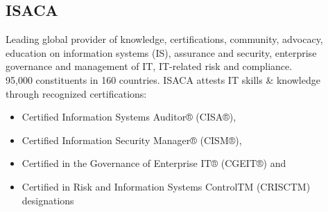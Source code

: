 \documentclass[a4]{article}
\begin{document}
\begin{multicols}{3}
\subsection{ISACA}
Leading global provider of knowledge, certifications, community, advocacy, education on information systems (IS), 
assurance and security, enterprise governance and management of IT, IT-related risk and compliance.\\
95,000 constituents in 160 countries. ISACA attests IT skills \& knowledge through recognized certifications:
\begin{itemize}
    \item Certified Information Systems Auditor® (CISA®),
    \item Certified Information Security Manager® (CISM®),
    \item Certified in the Governance of Enterprise IT® (CGEIT®) and
    \item Certified in Risk and Information Systems ControlTM (CRISCTM) designations
\end{itemize}


\end{multicols}
\end{document}
